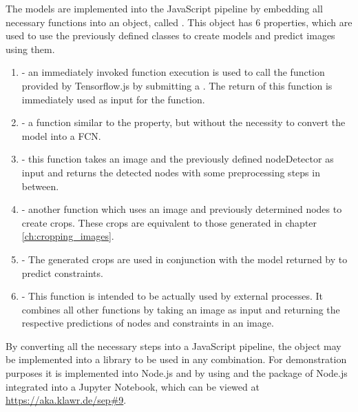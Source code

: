 The models are implemented into the JavaScript pipeline by embedding all necessary functions into an object, called .
This object has 6 properties, which are used to use the previously defined classes to create models and predict images using them.

\begin{enumerate}
    \item {} - an immediately invoked function execution is used to call the  function provided by Tensorflow.js by submitting a .
    The return of this function is immediately used as input for the  function.
    \item {} - a function similar to the  property, but without the necessity to convert the model into a FCN.
    \item {} - this function takes an image and the previously defined nodeDetector as input and returns the detected nodes with some preprocessing steps in between.
    \item {} - another function which uses an image and previously determined nodes to create crops. These crops are equivalent to those generated in chapter \ref{ch:cropping_images}.
    \item {} - The generated crops are used in conjunction with the model returned by  to predict constraints.
    \item {} - This function is intended to be actually used by external processes.
    It combines all other functions by taking an image as input and returning the respective predictions of nodes and constraints in an image.
\end{enumerate}

By converting all the necessary steps into a JavaScript pipeline, the  object may be implemented into a library to be used in any combination.
For demonstration purposes it is implemented into Node.js %
and by using  and the  package of Node.js %
integrated into a Jupyter Notebook, which can be viewed at \url{https://aka.klawr.de/sep\#9}.
